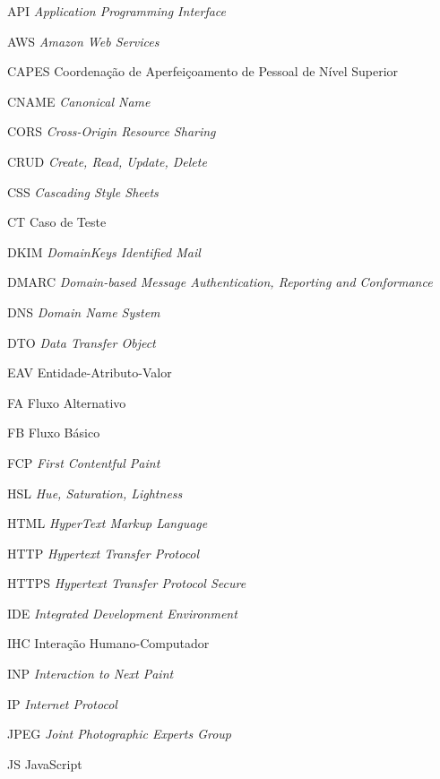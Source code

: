 \begin{siglas}
	\item[API] \textit{Application Programming Interface}
	\item[AWS] \textit{Amazon Web Services}
	\item[CAPES] Coordenação de Aperfeiçoamento de Pessoal de Nível Superior
	\item[CNAME] \textit{Canonical Name}
	\item[CORS] \textit{Cross-Origin Resource Sharing}
	\item[CRUD] \textit{Create, Read, Update, Delete}
	\item[CSS] \textit{Cascading Style Sheets}
	\item[CT] Caso de Teste
	\item[DKIM] \textit{DomainKeys Identified Mail}
	\item[DMARC] \textit{Domain-based Message Authentication, Reporting and Conformance}
	\item[DNS] \textit{Domain Name System}
	\item[DTO] \textit{Data Transfer Object}
	\item[EAV] Entidade-Atributo-Valor
	\item[FA] Fluxo Alternativo
	\item[FB] Fluxo Básico
	\item[FCP] \textit{First Contentful Paint}
	\item[HSL] \textit{Hue, Saturation, Lightness}
	\item[HTML] \textit{HyperText Markup Language}
	\item[HTTP] \textit{Hypertext Transfer Protocol}
	\item[HTTPS] \textit{Hypertext Transfer Protocol Secure}
	\item[IDE] \textit{Integrated Development Environment}
	\item[IHC] Interação Humano-Computador
	\item[INP] \textit{Interaction to Next Paint}
	\item[IP] \textit{Internet Protocol}
	\item[JPEG] \textit{Joint Photographic Experts Group}
	\item[JS] JavaScript

\end{siglas}
